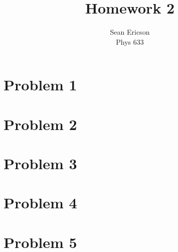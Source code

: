 \documentclass[12pt]{article}
\begin{document}
	
\title{Homework 2}
\author{Sean Ericson \\ Phys 633}
\maketitle

\section*{Problem 1}



\section*{Problem 2}



\section*{Problem 3}


\section*{Problem 4}



\section*{Problem 5}
\end{document}
